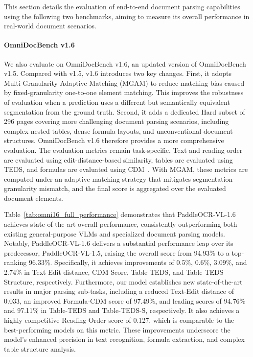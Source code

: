 \documentclass[11pt, a4paper,logo,  copyright, nonumbering]{paddleocr}
\begin{document}
This section details the evaluation of end-to-end document parsing capabilities using the following two benchmarks, aiming to measure its overall performance in real-world document scenarios. 

\paragraph{OmniDocBench v1.6} We also evaluate on OmniDocBench v1.6, an updated version of OmniDocBench v1.5. Compared with v1.5, v1.6 introduces two key changes. First, it adopts Multi-Granularity Adaptive Matching (MGAM) to reduce matching bias caused by fixed-granularity one-to-one element matching. This improves the robustness of evaluation when a prediction uses a different but semantically equivalent segmentation from the ground truth. Second, it adds a dedicated Hard subset of 296 pages covering more challenging document parsing scenarios, including complex nested tables, dense formula layouts, and unconventional document structures. OmniDocBench v1.6 therefore provides a more comprehensive evaluation. The evaluation metrics remain task-specific. Text and reading order are evaluated using edit-distance-based similarity, tables are evaluated using TEDS, and formulas are evaluated using CDM~\cite{Wang_cdm_2025_CVPR}. With MGAM, these metrics are computed under an adaptive matching strategy that mitigates segmentation-granularity mismatch, and the final score is aggregated over the evaluated document elements.

Table~\ref{tab:omni16_full_performance} demonstrates that PaddleOCR-VL-1.6 achieves state-of-the-art overall performance, consistently outperforming both existing general-purpose VLMs and specialized document parsing models. Notably, PaddleOCR-VL-1.6 delivers a substantial performance leap over its predecessor, PaddleOCR-VL-1.5, raising the overall score from 94.93\% to a top-ranking 96.33\%. Specifically, it achieves improvements of 0.5\%, 0.6\%, 3.09\%, and 2.74\% in Text-Edit distance, CDM Score, Table-TEDS, and Table-TEDS-Structure, respectively. Furthermore, our model establishes new state-of-the-art results in major parsing sub-tasks, including a reduced Text-Edit distance of 0.033, an improved Formula-CDM score of 97.49\%, and leading scores of 94.76\% and 97.11\% in Table-TEDS and Table-TEDS-S, respectively. It also achieves a highly competitive Reading Order score of 0.127, which is comparable to the best-performing models on this metric. These improvements underscore the model's enhanced precision in text recognition, formula extraction, and complex table structure analysis.
\end{document}
